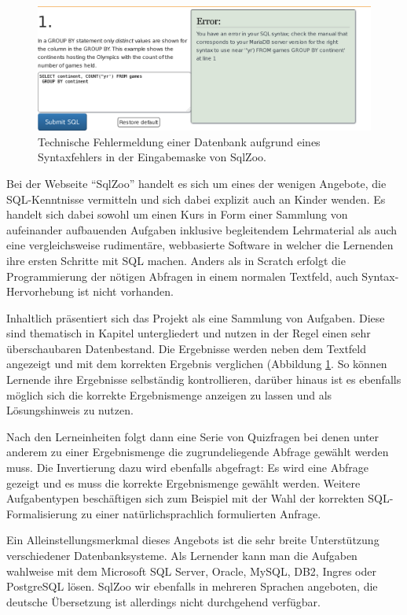 \begin{figure}[p]
  \centering \includegraphics[width=\textwidth]{images/related-work-sql-zoo-error.png}
  \caption{Technische Fehlermeldung einer Datenbank aufgrund eines Syntaxfehlers in der Eingabemaske von SqlZoo.}
  \label{fig:sqlzoo-check-result}
\end{figure}

Bei der Webseite "`SqlZoo"' handelt es sich um eines der wenigen Angebote, die SQL-Kenntnisse vermitteln und sich dabei explizit auch an Kinder wenden. Es handelt sich dabei sowohl um einen Kurs in Form einer Sammlung von aufeinander aufbauenden Aufgaben inklusive begleitendem Lehrmaterial als auch eine vergleichsweise rudimentäre, webbasierte Software in welcher die Lernenden ihre ersten Schritte mit SQL machen. Anders als in Scratch erfolgt die Programmierung der nötigen Abfragen in einem normalen Textfeld, auch Syntax-Hervorhebung ist nicht vorhanden.

Inhaltlich präsentiert sich das Projekt als eine Sammlung von Aufgaben. Diese sind thematisch in Kapitel untergliedert und nutzen in der Regel einen sehr überschaubaren Datenbestand. Die Ergebnisse werden neben dem Textfeld angezeigt und mit dem korrekten Ergebnis verglichen (Abbildung \ref{fig:sqlzoo-check-result}. So können Lernende ihre Ergebnisse selbständig kontrollieren, darüber hinaus ist es ebenfalls möglich sich die korrekte Ergebnismenge anzeigen zu lassen und als Lösungshinweis zu nutzen.

Nach den Lerneinheiten folgt dann eine Serie von Quizfragen bei denen unter anderem zu einer Ergebnismenge die zugrundeliegende Abfrage gewählt werden muss. Die Invertierung dazu wird ebenfalls abgefragt: Es wird eine Abfrage gezeigt und es muss die korrekte Ergebnismenge gewählt werden. Weitere Aufgabentypen beschäftigen sich zum Beispiel mit der Wahl der korrekten SQL-Formalisierung zu einer natürlichsprachlich formulierten Anfrage.

Ein Alleinstellungsmerkmal dieses Angebots ist die sehr breite Unterstützung verschiedener Datenbanksysteme. Als Lernender kann man die Aufgaben wahlweise mit dem Microsoft SQL Server, Oracle, MySQL, DB2, Ingres oder PostgreSQL lösen. SqlZoo wir ebenfalls in mehreren Sprachen angeboten, die deutsche Übersetzung ist allerdings nicht durchgehend verfügbar.

